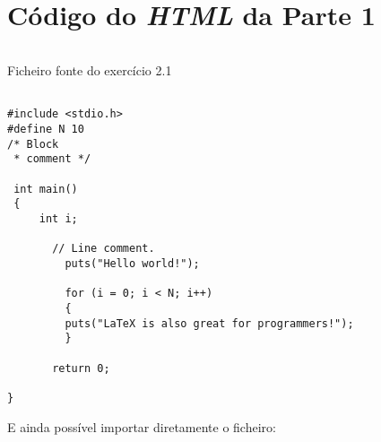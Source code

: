 \appendix

\chapter{Código do \emph{HTML} da Parte 1}
\label{appendix:a}

\begin{longlisting}
	\inputminted{html}{testes/res_html.html}
	\caption{Ficheiro fonte do exercício 2.1}
	\label{listing:1}
\end{longlisting}




\begin{verbatim}

#include <stdio.h>
#define N 10
/* Block
 * comment */

 int main()
 {
     int i;
	 
	   // Line comment.
		 puts("Hello world!");
			     
		 for (i = 0; i < N; i++)
		 {
		 puts("LaTeX is also great for programmers!");
		 }
							 
	   return 0;
				
}
\end{verbatim}


E ainda possível importar diretamente o ficheiro:






